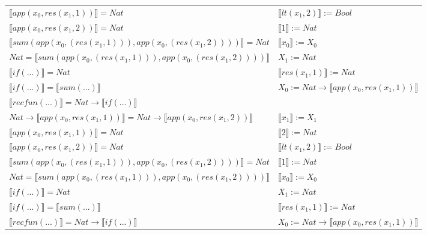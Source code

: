 \begin{exercise}
\begin{description}
\begin{center}
\begin{longtable}[!h]{ | l | l | }
                        $ \llbracket app(x_0, res(x_1,1)) \rrbracket = Nat$ & $ \llbracket lt(x_1 , 2) \rrbracket := Bool$\\
                        $ \llbracket app(x_0, res(x_1,2)) \rrbracket = Nat$ &  $ \llbracket 1 \rrbracket := Nat$\\
                        $ \llbracket sum(app(x_0, (res(x_1,1))), app(x_0, (res(x_1,2))))  \rrbracket = Nat$ & $ \llbracket x_0 \rrbracket := X_0$\\
                        $Nat =  \llbracket sum(app(x_0, (res(x_1,1))), app(x_0, (res(x_1,2)))) \rrbracket$ & $X_1 := Nat$\\
                        $ \llbracket if(...) \rrbracket = Nat$ &  $ \llbracket res(x_1,1) \rrbracket := Nat$\\
                        $ \llbracket if(...) \rrbracket =  \llbracket sum(...) \rrbracket$ &  $X_0 := Nat \to  \llbracket app(x_0, res(x_1,1)) \rrbracket$\\
                        $ \llbracket recfun(...) \rrbracket =   Nat  \to  \llbracket if(...) \rrbracket $ & \\
                    \hline
                        $Nat \to  \llbracket app(x_0, res(x_1,1)) \rrbracket = Nat \to  \llbracket app(x_0, res(x_1,2)) \rrbracket$ & $ \llbracket x_1 \rrbracket := X_1$\\
                        $ \llbracket app(x_0, res(x_1,1)) \rrbracket = Nat$ & $ \llbracket 2 \rrbracket := Nat$\\
                        $ \llbracket app(x_0, res(x_1,2)) \rrbracket = Nat$ & $ \llbracket lt(x_1 , 2) \rrbracket := Bool$\\
                        $ \llbracket sum(app(x_0, (res(x_1,1))), app(x_0, (res(x_1,2))))  \rrbracket = Nat$ &  $ \llbracket 1 \rrbracket := Nat$\\
                        $Nat =  \llbracket sum(app(x_0, (res(x_1,1))), app(x_0, (res(x_1,2)))) \rrbracket$ & $ \llbracket x_0 \rrbracket := X_0$\\
                        $ \llbracket if(...) \rrbracket = Nat$ & $X_1 := Nat$\\
                        $ \llbracket if(...) \rrbracket =  \llbracket sum(...) \rrbracket$ & $ \llbracket res(x_1,1) \rrbracket := Nat$\\
                        $ \llbracket recfun(...) \rrbracket =   Nat  \to  \llbracket if(...) \rrbracket $& $X_0 := Nat \to  \llbracket app(x_0, res(x_1,1)) \rrbracket$ \\

\end{longtable}
\end{center}
\end{description}
\end{exercise}
